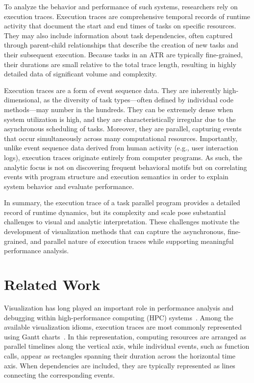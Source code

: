 \begin{refsection}
To analyze the behavior and performance of such systems, researchers rely on execution traces. Execution traces are comprehensive temporal records of runtime activity that document the start and end times of tasks on specific resources. They may also include information about task dependencies, often captured through parent-child relationships that describe the creation of new tasks and their subsequent execution. Because tasks in an ATR are typically fine-grained, their durations are small relative to the total trace length, resulting in highly detailed data of significant volume and complexity.

Execution traces are a form of event sequence data. They are inherently high-dimensional, as the diversity of task types—often defined by individual code methods—may number in the hundreds. They can be extremely dense when system utilization is high, and they are characteristically irregular due to the asynchronous scheduling of tasks. Moreover, they are parallel, capturing events that occur simultaneously across many computational resources. Importantly, unlike event sequence data derived from human activity (e.g., user interaction logs), execution traces originate entirely from computer programs. As such, the analytic focus is not on discovering frequent behavioral motifs but on correlating events with program structure and execution semantics in order to explain system behavior and evaluate performance.

In summary, the execution trace of a task parallel program provides a detailed record of runtime dynamics, but its complexity and scale pose substantial challenges to visual and analytic interpretation. These challenges motivate the development of visualization methods that can capture the asynchronous, fine-grained, and parallel nature of execution traces while supporting meaningful performance analysis.

\section{Related Work}
\label{sec:travrelated}
Visualization has long played an important role in performance analysis and debugging within high-performance computing (HPC) systems~\cite{isaacs2014state, ezzati2017multi}. Among the available visualization idioms, execution traces are most commonly represented using Gantt charts~\cite{nagel1996vampir, zaki1999toward, graham2004gprof, reinders2005vtune, adhianto2010hpctoolkit, drebes2014aftermath, zhukov2015scalasca, Pinto2016, xie2018visual}. In this representation, computing resources are arranged as parallel timelines along the vertical axis, while individual events, such as function calls, appear as rectangles spanning their duration across the horizontal time axis. When dependencies are included, they are typically represented as lines connecting the corresponding events.


\end{refsection}
